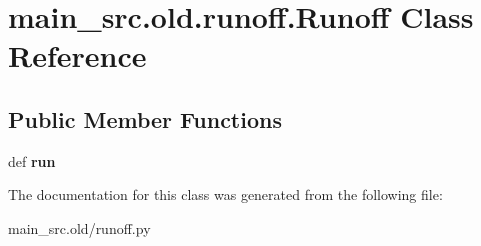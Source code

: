 \hypertarget{classmain__src_8old_1_1runoff_1_1Runoff}{\section{main\-\_\-src.\-old.\-runoff.\-Runoff Class Reference}
\label{classmain__src_8old_1_1runoff_1_1Runoff}
}
\subsection*{Public Member Functions}
\begin{DoxyCompactItemize}
\item 
\hypertarget{classmain__src_8old_1_1runoff_1_1Runoff_abbae68b3ff18c92adff485c70dd6671b}{def {\bfseries run}}\label{classmain__src_8old_1_1runoff_1_1Runoff_abbae68b3ff18c92adff485c70dd6671b}

\end{DoxyCompactItemize}


The documentation for this class was generated from the following file\-:\begin{DoxyCompactItemize}
\item 
main\-\_\-src.\-old/runoff.\-py\end{DoxyCompactItemize}
